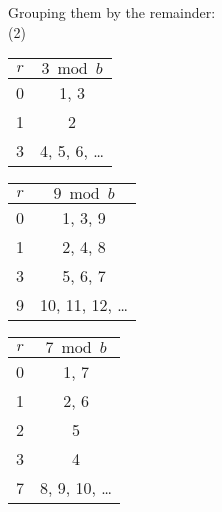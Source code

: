 \noindent
Grouping them by the remainder:\\
(2)
\begin{minipage}{0.32\textwidth}
    \centering
    \begin{tabular}{c|c}
        \rowcolor{OliveGreen!10}$r$ & $3 \bmod b$    \\
        \hline
        0                           & 1, 3           \\
        1                           & 2              \\
        3                           & 4, 5, 6, \dots \\
    \end{tabular}
\end{minipage}%
\begin{minipage}{0.32\textwidth}
    \centering
    \begin{tabular}{c|c}
        \rowcolor{OliveGreen!10}$r$ & $9 \bmod b$       \\
        \hline
        0                           & 1, 3, 9           \\
        1                           & 2, 4, 8           \\
        3                           & 5, 6, 7           \\
        9                           & 10, 11, 12, \dots \\
    \end{tabular}
\end{minipage}%
\begin{minipage}{0.32\textwidth}
    \centering
    \begin{tabular}{c|c}
        \rowcolor{OliveGreen!10}$r$ & $7 \bmod b$     \\
        \hline
        0                           & 1, 7            \\
        1                           & 2, 6            \\
        2                           & 5               \\
        3                           & 4               \\
        7                           & 8, 9, 10, \dots \\
    \end{tabular}
\end{minipage}


